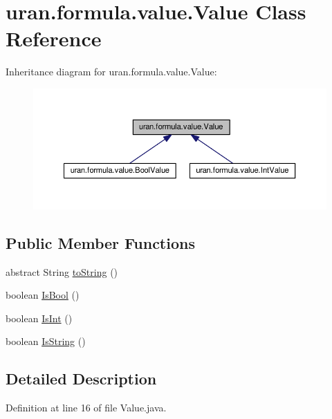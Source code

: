 \hypertarget{classuran_1_1formula_1_1value_1_1_value}{}\section{uran.\+formula.\+value.\+Value Class Reference}
\label{classuran_1_1formula_1_1value_1_1_value}


Inheritance diagram for uran.\+formula.\+value.\+Value\+:
\nopagebreak
\begin{figure}[H]
\begin{center}
\leavevmode
\includegraphics[width=350pt]{classuran_1_1formula_1_1value_1_1_value__inherit__graph}
\end{center}
\end{figure}
\subsection*{Public Member Functions}
\begin{DoxyCompactItemize}
\item 
abstract String \hyperlink{classuran_1_1formula_1_1value_1_1_value_a0bdc35e5dd7fd5f5d0e5fc01ca6aa2d0}{to\+String} ()
\item 
boolean \hyperlink{classuran_1_1formula_1_1value_1_1_value_add7ee33b9d1b69392002aff2cfe8a252}{Is\+Bool} ()
\item 
boolean \hyperlink{classuran_1_1formula_1_1value_1_1_value_a75f22df896f49dde2d21965d290ef3e1}{Is\+Int} ()
\item 
boolean \hyperlink{classuran_1_1formula_1_1value_1_1_value_ae1b964ac599b0124c028e52b8a2c4074}{Is\+String} ()
\end{DoxyCompactItemize}


\subsection{Detailed Description}


Definition at line 16 of file Value.\+java.



